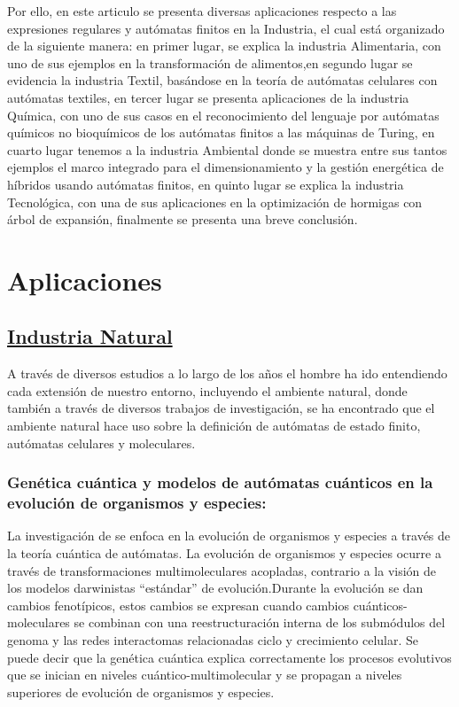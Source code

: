 \documentclass[10pt,conference]{IEEEtran}
\begin{document}
    Por ello, en este articulo se presenta diversas aplicaciones respecto a las expresiones regulares y autómatas finitos en la Industria, el cual está organizado de la siguiente manera: en primer lugar, se explica la industria Alimentaria, con uno de sus ejemplos en la transformación de alimentos,en segundo lugar se evidencia la industria Textil, basándose en la teoría de autómatas celulares con autómatas textiles, en tercer lugar se presenta aplicaciones de la industria Química, con uno de sus casos en el reconocimiento del lenguaje por autómatas químicos no bioquímicos de los autómatas finitos a las máquinas de Turing, en cuarto lugar tenemos a la industria Ambiental donde se muestra entre sus tantos ejemplos el marco integrado para el dimensionamiento y la gestión energética de híbridos usando autómatas finitos, en quinto lugar se explica la industria Tecnológica, con una de sus aplicaciones en la optimización de hormigas con árbol de expansión, finalmente se presenta una breve conclusión.
    
\vspace{1mm}    
\section{\textbf{Aplicaciones}}

\vspace{2mm}
\subsection{\underline{\textbf{Industria Natural}}}
A través de diversos estudios a lo largo de los años el hombre ha ido entendiendo cada extensión de nuestro entorno, incluyendo el ambiente natural, donde también a través de diversos trabajos de investigación, se ha encontrado que el ambiente natural hace uso sobre la definición de autómatas de estado finito, autómatas celulares y moleculares.

\vspace{2mm}
\subsubsection{\textbf{Genética cuántica y modelos de autómatas cuánticos en la evolución de organismos y especies: }}
La investigación de  se enfoca en la evolución de organismos y especies a través de la teoría cuántica de autómatas. La evolución de organismos y especies ocurre a través de transformaciones multimoleculares acopladas, contrario a la visión de los modelos darwinistas ``estándar'' de evolución.Durante la evolución se dan cambios fenotípicos, estos cambios se expresan cuando cambios cuánticos-moleculares se combinan con una reestructuración interna de los submódulos del genoma y las redes interactomas relacionadas ciclo y crecimiento celular. Se puede decir que la genética cuántica explica correctamente los procesos evolutivos que se inician en niveles cuántico-multimolecular y se propagan a niveles superiores de evolución de organismos y especies.
\end{document}
